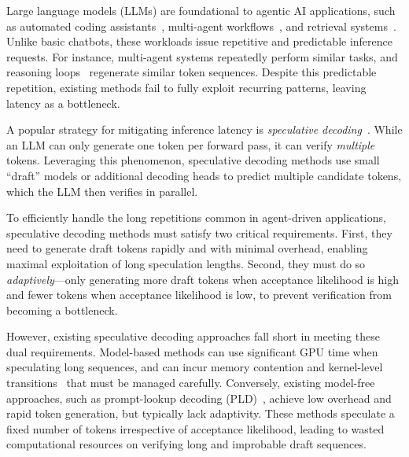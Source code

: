Large language models (LLMs) are foundational to agentic AI applications, such as automated coding assistants~\citep{openhands,yang2024sweagent}, multi-agent workflows~\citep{wang2024mixtureofagentsenhanceslargelanguage,chen2024autoagentsframeworkautomaticagent}, and retrieval systems~\citep{wang2024speculativeragenhancingretrieval,gao2024retrievalaugmentedgenerationlargelanguage}. Unlike basic chatbots, these workloads issue repetitive and predictable inference requests. For instance, multi-agent systems repeatedly perform similar tasks, and reasoning loops~\citep{wang2023selfconsistencyimproveschainthought,madaan2023selfrefine} regenerate similar token sequences. Despite this predictable repetition, existing methods fail to fully exploit recurring patterns, leaving latency as a bottleneck.

A popular strategy for mitigating inference latency is \emph{speculative decoding}~\citep{leviathan2022fast,chen2023accelerating,specinfer,cai2024medusasimplellminference,bita,draftverify}. While an LLM can only generate one token per forward pass, it can verify {\em multiple} tokens. Leveraging this phenomenon, speculative decoding methods use small ``draft'' models or additional decoding heads to predict multiple candidate tokens, which the LLM then verifies in parallel.

To efficiently handle the long repetitions common in agent-driven applications, speculative decoding methods must satisfy two critical requirements. First, they need to generate draft tokens rapidly and with minimal overhead, enabling maximal exploitation of long speculation lengths. Second, they must do so \emph{adaptively}---only generating more draft tokens when acceptance likelihood is high and fewer tokens when acceptance likelihood is low, to prevent verification from becoming a bottleneck.

However, existing speculative decoding approaches fall short in meeting these dual requirements. Model-based methods can use significant GPU time when speculating long sequences, and can incur memory contention and kernel-level transitions~\citep{sequoia,eagle2} that must be managed carefully. Conversely, existing model-free approaches, such as prompt-lookup decoding (PLD)~\citep{saxena2023prompt}, achieve low overhead and rapid token generation, but typically lack adaptivity. These methods speculate a fixed number of tokens irrespective of acceptance likelihood, leading to wasted computational resources on verifying long and improbable draft sequences.

